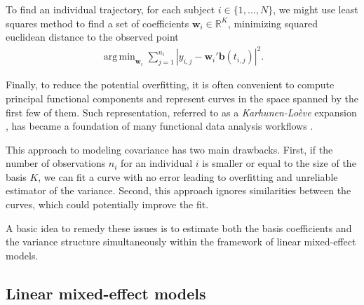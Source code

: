 \documentclass[preprint]{imsart}
\numberwithin{equation}{section}
\theoremstyle{plain}
\newcommand{\R}{\mathbb{R}}
\newcommand{\bb}{\mathbf{b}}
\newcommand{\bw}{\mathbf{w}}
\DeclareMathOperator*{\argmin}{arg\,min}
\begin{document}
To find an individual trajectory, for each subject $i \in \{ 1,...,N \}$, we might use least squares method to find a set of coefficients $\bw_i \in \R^K$, minimizing squared euclidean distance to the observed point
\begin{align}\label{eq:direct-individual}
 \argmin_{\bw_i}\sum_{j=1}^{n_i}\left|y_{i,j} - \bw_i'\bb(t_{i,j})\right|^2.
\end{align}

Finally, to reduce the potential overfitting, it is often convenient to compute principal functional components and represent curves in the space spanned by the first few of them. Such representation, referred to as a {\it Karhunen-Lo\`eve} expansion \citep{watanabe1965karhunen,kosambi2016statistics}, has became a foundation of many functional data analysis workflows \citep{ramsay1991some,yao2005linear,cnaan1997tutorial,laird1988missing,horvath2012inference,besse1997simultaneous}. %

This approach to modeling covariance has two main drawbacks. First, if the number of observations $n_i$ for an individual $i$ is smaller or equal to the size of the basis $K$, we can fit a curve with no error leading to overfitting and unreliable estimator of the variance. Second, this approach ignores similarities between the curves, which could potentially improve the fit.

A basic idea to remedy these issues is to estimate both the basis coefficients and the variance structure simultaneously within the framework of linear mixed-effect models.

\subsection{Linear mixed-effect models}\label{ss:lmm}
\end{document}
